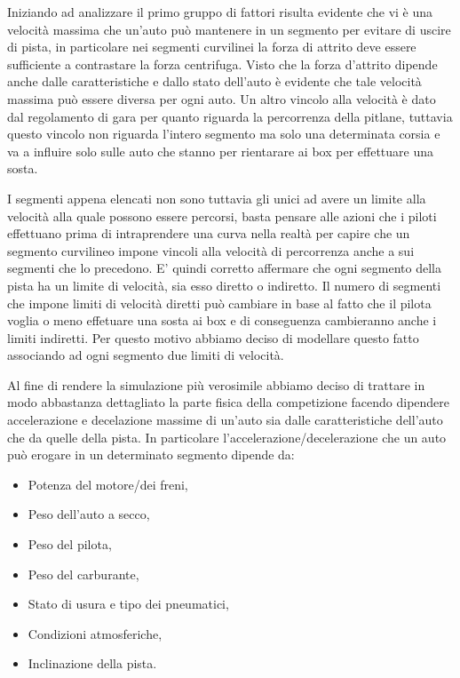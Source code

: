 \documentclass[11pt,a4paper]{report}
\begin{document}
Iniziando ad analizzare il primo gruppo di fattori risulta evidente che vi è una velocità massima che un'auto può mantenere in un segmento per evitare di uscire di pista, in particolare nei segmenti curvilinei la forza di attrito deve essere sufficiente a contrastare la forza centrifuga.
Visto che la forza d'attrito dipende anche dalle caratteristiche e dallo stato dell'auto è evidente che tale velocità massima può essere diversa per ogni auto.
Un altro vincolo alla velocità è dato dal regolamento di gara per quanto riguarda la percorrenza della pitlane, tuttavia questo vincolo non riguarda l'intero segmento ma solo una determinata corsia e va a influire solo sulle auto che stanno per rientarare ai box per effettuare una sosta.

I segmenti appena elencati non sono tuttavia gli unici ad avere un limite alla velocità alla quale possono essere percorsi, basta pensare alle azioni che i piloti effettuano prima di intraprendere una curva nella realtà per capire che un segmento curvilineo impone vincoli alla velocità di percorrenza anche a sui segmenti che lo precedono. E' quindi corretto affermare che ogni segmento della pista ha un limite di velocità, sia esso diretto o indiretto. Il numero di segmenti che impone limiti di velocità diretti può cambiare in base al fatto che il pilota voglia o meno effetuare una sosta ai box e di conseguenza cambieranno anche i limiti indiretti. Per questo motivo abbiamo deciso di modellare questo fatto associando ad ogni segmento due limiti di velocità.

Al fine di rendere la simulazione più verosimile abbiamo deciso di trattare in modo abbastanza dettagliato la parte fisica della competizione facendo dipendere accelerazione e decelazione massime di un'auto sia dalle caratteristiche dell'auto che da quelle della pista.
In particolare l'accelerazione/decelerazione che un auto può erogare in un determinato segmento dipende da:
\begin{itemize}
\item Potenza del motore/dei freni,
\item Peso dell'auto a secco,
\item Peso del pilota,
\item Peso del carburante,
\item Stato di usura e tipo dei pneumatici,
\item Condizioni atmosferiche,
\item Inclinazione della pista.
\end{itemize}
\end{document}
